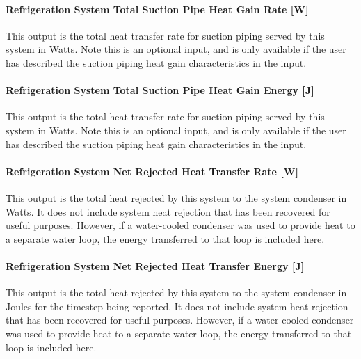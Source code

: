 \paragraph{Refrigeration System Total Suction Pipe Heat Gain Rate {[}W{]}}\label{refrigeration-system-total-suction-pipe-heat-gain-rate-w}

This output is the total heat transfer rate for suction piping served by this system in Watts. Note this is an optional input, and is only available if the user has described the suction piping heat gain characteristics in the input.

\paragraph{Refrigeration System Total Suction Pipe Heat Gain Energy {[}J{]}}\label{refrigeration-system-total-suction-pipe-heat-gain-energy-j}

This output is the total heat transfer rate for suction piping served by this system in Watts. Note this is an optional input, and is only available if the user has described the suction piping heat gain characteristics in the input.

\paragraph{Refrigeration System Net Rejected Heat Transfer Rate {[}W{]}}\label{refrigeration-system-net-rejected-heat-transfer-rate-w}

This output is the total heat rejected by this system to the system condenser in Watts. It does not include system heat rejection that has been recovered for useful purposes. However, if a water-cooled condenser was used to provide heat to a separate water loop, the energy transferred to that loop is included here.

\paragraph{Refrigeration System Net Rejected Heat Transfer Energy {[}J{]}}\label{refrigeration-system-net-rejected-heat-transfer-energy-j}

This output is the total heat rejected by this system to the system condenser in Joules for the timestep being reported. It does not include system heat rejection that has been recovered for useful purposes. However, if a water-cooled condenser was used to provide heat to a separate water loop, the energy transferred to that loop is included here.

